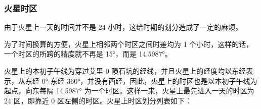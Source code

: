\documentclass[letterpaper,10pt]{sphinxmanual}
\begin{document}

\subsubsection{火星时区}
\label{mars:index-4}\label{mars:id22}
由于火星上一天的时间并不是 24 小时，这给时期的划分造成了一定的麻烦。

为了时间换算的方便，火星上相邻两个时区之间时差均为 1 个小时，这样的话，一个时区的所跨的精度就不再是 15°，而是 14.5987°。

火星上的本初子午线为穿过艾里-0 陨石坑的经线，并且火星上的经度均以东经表示，从东经 0°-东经 360°，并没有西经，因此，火星上的时区也是以本初子午线为起点，向东每隔 14.5987° 为一个时区。这样一来，火星上最先进入一天的时区为 24 区，即靠近 0 区左侧的时区。火星上时区划分列表如下：
\end{document}
